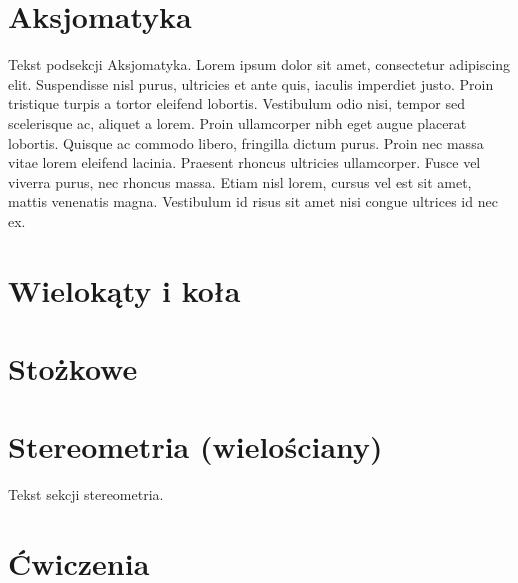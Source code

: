 \documentclass{greaseproof}
\newcommand{\loremipsum}{ {\color{gray}  Lorem ipsum dolor sit amet, consectetur adipiscing elit. Suspendisse nisl purus, ultricies et ante quis, iaculis imperdiet justo. Proin tristique turpis a tortor eleifend lobortis. Vestibulum odio nisi, tempor sed scelerisque ac, aliquet a lorem. Proin ullamcorper nibh eget augue placerat lobortis. Quisque ac commodo libero, fringilla dictum purus. Proin nec massa vitae lorem eleifend lacinia. Praesent rhoncus ultricies ullamcorper. Fusce vel viverra purus, nec rhoncus massa. Etiam nisl lorem, cursus vel est sit amet, mattis venenatis magna. Vestibulum id risus sit amet nisi congue ultrices id nec ex. } }
\begin{document}


\section{Aksjomatyka}
Tekst podsekcji Aksjomatyka. \loremipsum






\section{Wielokąty i koła}





\section{Stożkowe}






\section{Stereometria (wielościany)}
Tekst sekcji stereometria.

\section{Ćwiczenia}




\end{document}
